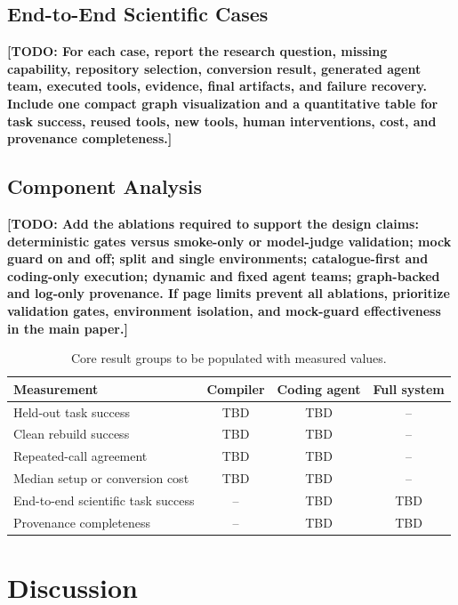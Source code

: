 \documentclass[letterpaper]{article} %
\newcommand{\drafttodo}[1]{\textbf{[TODO: #1]}}
\begin{document}
\subsection{End-to-End Scientific Cases}

\drafttodo{For each case, report the research question, missing capability, repository selection, conversion result, generated agent team, executed tools, evidence, final artifacts, and failure recovery. Include one compact graph visualization and a quantitative table for task success, reused tools, new tools, human interventions, cost, and provenance completeness.}

\subsection{Component Analysis}

\drafttodo{Add the ablations required to support the design claims: deterministic gates versus smoke-only or model-judge validation; mock guard on and off; split and single environments; catalogue-first and coding-only execution; dynamic and fixed agent teams; graph-backed and log-only provenance. If page limits prevent all ablations, prioritize validation gates, environment isolation, and mock-guard effectiveness in the main paper.}

\begin{table}[t]
\centering
\small
\caption{Core result groups to be populated with measured values.}
\label{tab:results}
\begin{tabular}{p{3.1cm}ccc}
\toprule
Measurement & Compiler & Coding agent & Full system \\
\midrule
Held-out task success & TBD & TBD & -- \\
Clean rebuild success & TBD & TBD & -- \\
Repeated-call agreement & TBD & TBD & -- \\
Median setup or conversion cost & TBD & TBD & -- \\
End-to-end scientific task success & -- & TBD & TBD \\
Provenance completeness & -- & TBD & TBD \\
\bottomrule
\end{tabular}
\end{table}

\section{Discussion}
\end{document}
